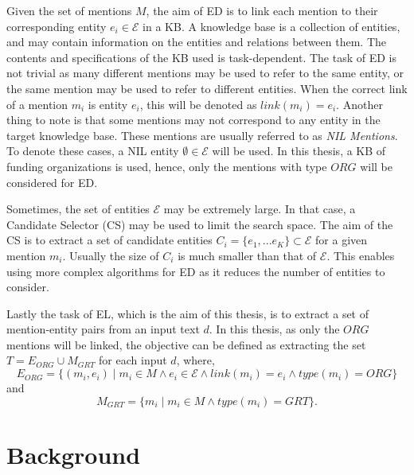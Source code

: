 \documentclass{report}
\theoremstyle{definition}
\theoremstyle{remark}
\begin{document}
Given the set of mentions $M$, the aim of ED is to link each mention to their corresponding entity $e_i \in \mathcal{E} $ in a KB. A knowledge base is a collection of entities, and may contain information on the entities and relations between them. The contents and specifications of the KB used is task-dependent. The task of ED is not trivial as many different mentions may be used to refer to the same entity, or the same mention may be used to refer to different entities. When the correct link of a mention $m_i$ is entity $e_i$, this will be denoted as $link(m_i) = e_i $.  Another thing to note is that some mentions may not correspond to any entity in the target knowledge base. These mentions are usually referred to as \textit{NIL Mentions}. To denote these cases, a NIL entity $\emptyset \in \mathcal{E}$ will be used. In this thesis, a KB of funding organizations is used, hence, only the mentions with type $ORG$ will be considered for ED.

Sometimes, the set of entities $\mathcal{E}$ may be extremely large. In that case, a Candidate Selector (CS) may be used to limit the search space. The aim of the CS is to extract a set of candidate entities $C_i = \{e_1,...e_K\} \subset \mathcal{E} $ for a given mention $m_i$. Usually the size of $C_i$ is much smaller than that of $\mathcal{E}$. This enables using more complex algorithms for ED as it reduces the number of entities to consider.

Lastly the task of EL, which is the aim of this thesis, is to extract a set of mention-entity pairs from an input text $d$. In this thesis, as only the $ORG$ mentions will be linked, the objective can be defined as extracting the set $T = E_{ORG} \cup M_{GRT}$ for each input $d$, where,
\begin{equation}
E_{ORG}=\{(m_i,e_i) \mid m_i \in M \land e_i \in \mathcal{E} \land link(m_i)=e_i \land type(m_i) = ORG\}
\end{equation}
and 
\begin{equation}
M_{GRT} = \{m_i \mid m_i \in M \land type(m_i) = GRT\}.
\end{equation}

\section{Background}
\label{sec:BERT}
\end{document}
